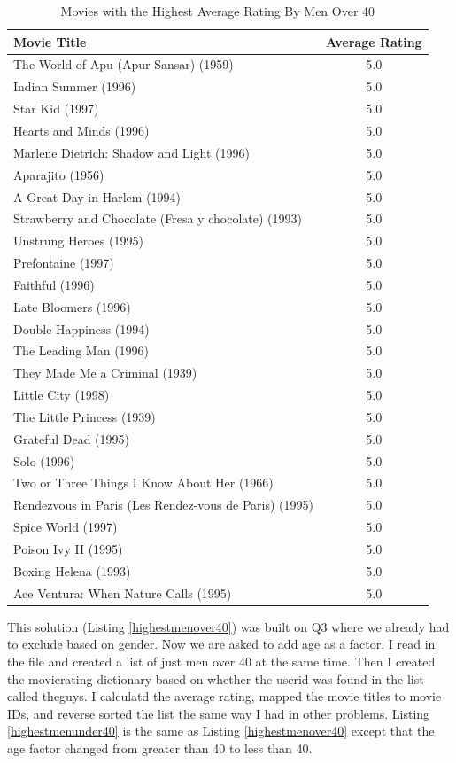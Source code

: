\documentclass{article}
\begin{document}
\begin{table}[!h]
\centering
\begin{tabular}{l c}
Movie Title & Average Rating \\
\hline
The World of Apu (Apur Sansar) (1959) & 5.0 \\
Indian Summer (1996) & 5.0 \\
Star Kid (1997) & 5.0 \\
Hearts and Minds (1996) & 5.0 \\
Marlene Dietrich: Shadow and Light (1996)  & 5.0 \\
Aparajito (1956) & 5.0 \\
A Great Day in Harlem (1994) & 5.0 \\
Strawberry and Chocolate (Fresa y chocolate) (1993) & 5.0 \\
Unstrung Heroes (1995) & 5.0 \\
Prefontaine (1997) & 5.0 \\
Faithful (1996) & 5.0 \\
Late Bloomers (1996) & 5.0 \\
Double Happiness (1994) & 5.0 \\
The Leading Man (1996) & 5.0 \\
They Made Me a Criminal (1939) & 5.0 \\
Little City (1998) & 5.0 \\
The Little Princess (1939) & 5.0 \\
Grateful Dead (1995) & 5.0 \\
Solo (1996) & 5.0 \\
Two or Three Things I Know About Her (1966) & 5.0 \\
Rendezvous in Paris (Les Rendez-vous de Paris) (1995) & 5.0 \\
Spice World (1997) & 5.0 \\
Poison Ivy II (1995) & 5.0 \\
Boxing Helena (1993) & 5.0 \\
Ace Ventura: When Nature Calls (1995) & 5.0 \\
\hline
\end{tabular}
\caption{Movies with the Highest Average Rating By Men Over 40}
\end{table}

This solution (Listing \ref{highestmenover40}) was built on Q3 where we already had to exclude based on gender. Now we are asked to add age as a factor. I read in the file and created a list of just men over 40 at the same time. Then I  created the movierating dictionary based on whether the userid was found in the list called theguys. I calculatd the average rating, mapped the movie titles to movie IDs, and reverse sorted the list the same way I had in other problems. Listing \ref{highestmenunder40} is the same as Listing \ref{highestmenover40} except that the age factor changed from greater than 40 to less than 40.
\end{document}
